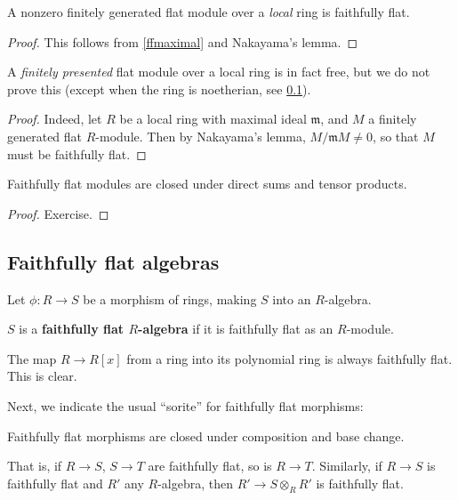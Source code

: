 \begin{corollary} 
A nonzero finitely generated flat module over a \emph{local} ring is faithfully flat.
\end{corollary} 
\begin{proof} 
This follows from \cref{ffmaximal} and Nakayama's lemma. 
\end{proof} 

A \emph{finitely presented} flat module over a local ring is in fact free, but we do not prove
this (except when the ring is noetherian, see \cref{}).
\begin{proof} 
Indeed, let $R$ be a local ring with maximal ideal $\mathfrak{m}$, and $M$ a
finitely generated flat $R$-module. Then by Nakayama's lemma, $M/\mathfrak{m}M
\neq 0$, so that $M$ must be faithfully flat.
\end{proof} 

\begin{proposition} 
Faithfully flat modules are closed under direct sums and tensor products.
\end{proposition} 

\begin{proof} 
Exercise.
\end{proof} 




\subsection{Faithfully flat algebras}

Let $\phi: R \to S$ be a morphism of rings, making $S$ into an $R$-algebra.

\begin{definition} 
$S$ is a \textbf{faithfully flat $R$-algebra} if it is faithfully flat as an
$R$-module.
\end{definition} 

\begin{example} 
The map $R \to R[x]$ from a ring into its polynomial ring is always faithfully
flat. This is clear.
\end{example}

Next, we indicate the usual ``sorite'' for faithfully flat morphisms:
\begin{proposition} 
Faithfully flat morphisms are closed under composition and base change.
\end{proposition} 
That is, if $R \to S$, $S \to T$ are faithfully flat, so is $R \to T$.
Similarly, if $R \to S$ is faithfully flat and $R'$ any $R$-algebra, then $R'
\to S \otimes_R R'$ is faithfully flat.

